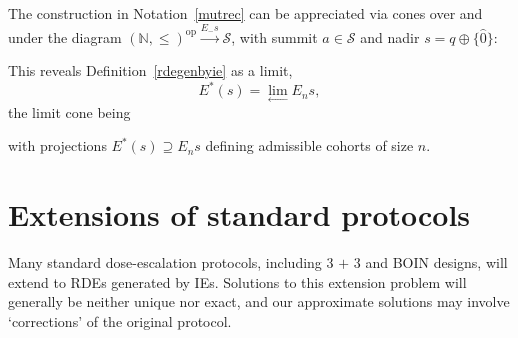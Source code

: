 \documentclass{article}
\newcommand{\N}{\mathbb{N}}
\renewcommand{\S}{\ensuremath{\mathcal{S}}} %
\DeclareMathOperator{\dual}{op}
\begin{document}
The construction in Notation~\ref{mutrec} can be appreciated via cones over and under the diagram $(\N,\le)^{\dual} \xrightarrow{E_{-} s} \S$, with summit $a \in \S$ and nadir $s = q\oplus\{\widehat{0}\}$:
\begin{center}
\end{center}
This reveals Definition~\ref{rdegenbyie} as a limit,
$$
E^*(s) = \lim_{\longleftarrow} E_ns,
$$
the limit cone being
\begin{center}
\end{center}
with projections $E^*(s) \supseteq E_ns$ defining admissible cohorts of size $n$.

\section{Extensions of standard protocols}

\begin{conj}\label{extend}
  Many standard dose-escalation protocols, including $\mbox{3 + 3}$ and BOIN designs, will extend to RDEs generated by IEs.  Solutions to this extension problem will generally be neither unique nor exact, and our approximate solutions may involve `corrections' of the original protocol.
\end{conj}
\end{document}
